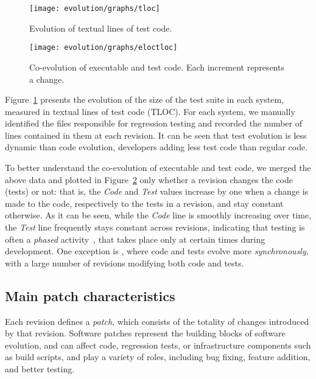 \begin{figure}[t]
\centering
\texttt{[image: evolution/graphs/tloc]}
\caption{Evolution of textual lines of test code.}
\label{fig:tloc-evol}
\end{figure}


\begin{figure}[t]
\centering
\texttt{[image: evolution/graphs/eloctloc]}
\caption{Co-evolution of executable and test code. Each increment represents a change.}
\label{fig:coeloctloc}
\end{figure}


Figure~\ref{fig:tloc-evol} presents the evolution of the size of the
test suite in each system, measured in textual lines of test code
(TLOC).  For each system, we manually identified the files responsible
for regression testing and recorded the number of lines contained in
them at each revision. It can be seen that test evolution is less
dynamic than code evolution, developers adding less test code than
regular code.


To better understand the co-evolution of executable and test code, we
merged the above data and plotted in Figure~\ref{fig:coeloctloc}
only whether a revision changes the code (tests) or not: that is,
the \emph{Code} and \emph{Test} values increase by one when a change is
made to the code, respectively to the tests in a revision, and stay constant
otherwise.  As it can be seen, while the \emph{Code} line is smoothly
increasing over time, the \emph{Test} line frequently stays constant
across revisions, indicating that testing is often a \textit{phased}
activity~\cite{coevol:emse11}, that takes place only at certain times
during development. One exception is \git, where code and
tests evolve more \textit{synchronously}, with a large number of
revisions modifying both code and tests.

\subsection{Main patch characteristics}


Each revision defines a \textit{patch}, which consists of the totality
of changes introduced by that revision.  Software patches represent
the building blocks of software evolution, and 
can affect code, regression tests, or infrastructure components such
as build scripts, and play a variety of roles, including bug fixing,
feature addition, and better testing.  

